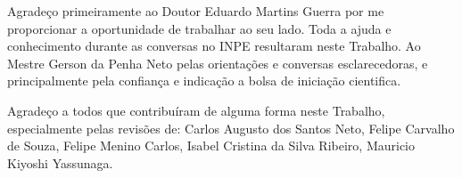 \begin{agradecimentos}
\par Agradeço primeiramente ao Doutor Eduardo Martins Guerra por me proporcionar a oportunidade de trabalhar ao seu lado. Toda a ajuda e conhecimento durante as conversas no INPE resultaram neste Trabalho. Ao Mestre Gerson da Penha Neto pelas orientações e conversas esclarecedoras, e principalmente pela confiança e indicação a bolsa de iniciação cientifica.
\par Agradeço a todos que contribuíram de alguma forma neste Trabalho, especialmente pelas revisões de: Carlos Augusto dos Santos Neto,  Felipe Carvalho de Souza, Felipe Menino Carlos, Isabel Cristina da Silva Ribeiro, Mauricio Kiyoshi Yassunaga.
\end{agradecimentos}